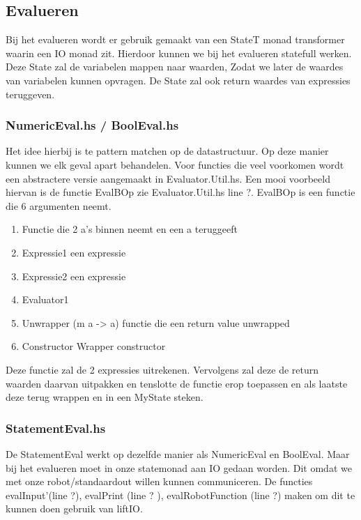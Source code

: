 \documentclass[a4paper,10pt]{article}
\begin{document}
  \subsection{Evalueren}
    Bij het evalueren wordt er gebruik gemaakt van een StateT monad transformer waarin een IO monad zit.
    Hierdoor kunnen we bij het evalueren statefull werken. Deze State zal de variabelen mappen naar waarden,
    Zodat we later de waardes van variabelen kunnen opvragen.
    De State zal ook return waardes van expressies teruggeven.
    
    \subsubsection{NumericEval.hs / BoolEval.hs}
      Het idee hierbij is te pattern matchen op de datastructuur. Op deze manier kunnen we elk geval apart behandelen.
      Voor functies die veel voorkomen wordt een abstractere versie aangemaakt in Evaluator.Util.hs.
      Een mooi voorbeeld hiervan is de functie EvalBOp zie Evaluator.Util.hs line ?.
      EvalBOp is een functie die 6 argumenten neemt.
      \begin{enumerate}
        \item Functie die 2 a's binnen neemt en een a teruggeeft
        \item Expressie1 een expressie
        \item Expressie2 een expressie
        \item Evaluator1
        \item Unwrapper (m a -> a) functie die een return value unwrapped
        \item Constructor Wrapper constructor
      \end{enumerate}
      Deze functie zal de 2 expressies uitrekenen.
      Vervolgens zal deze de return waarden daarvan uitpakken en tenslotte
      de functie erop toepassen en als laatste deze terug wrappen en in een MyState steken.
      
    \subsubsection{StatementEval.hs}
    De StatementEval werkt op dezelfde manier als NumericEval en BoolEval.
    Maar bij het evalueren moet in onze statemonad aan IO gedaan worden.
    Dit omdat we met onze robot/standaardout willen kunnen communiceren.
    De functies evalInput'(line ?), evalPrint (line ? ), evalRobotFunction (line ?) maken om dit te kunnen doen gebruik van liftIO.
\end{document}
